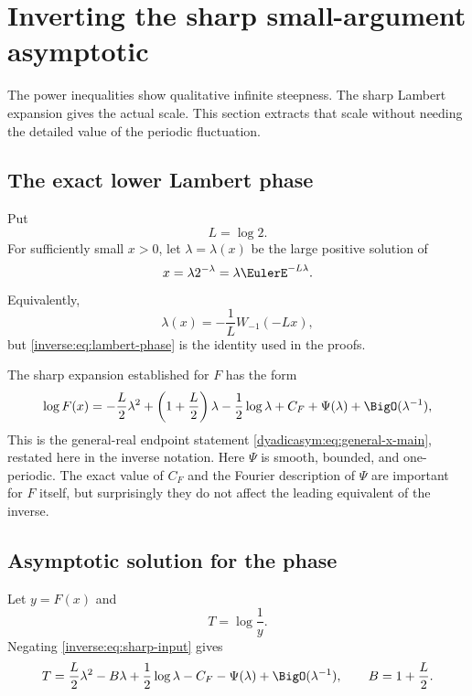 \documentclass[11pt,oneside]{article}
\theoremstyle{definition}
\theoremstyle{remark}
\begin{document}
\section{Inverting the sharp small-argument asymptotic}
\label{inverse:sec:inverse-asymptotic}

The power inequalities show qualitative infinite steepness.  The sharp
Lambert expansion gives the actual scale.  This section extracts that
scale without needing the detailed value of the periodic fluctuation.

\subsection{The exact lower Lambert phase}

Put
\[
 L=\log2.
\]
For sufficiently small $x>0$, let $\lambda=\lambda(x)$ be the large
positive solution of
\begin{equation}
 x=\lambda2^{-\lambda}
   =\lambda\EulerE^{-L\lambda}. \label{inverse:eq:lambert-phase}
\end{equation}
Equivalently,
\[
 \lambda(x)=-\frac1L W_{-1}(-Lx),
\]
but \eqref{inverse:eq:lambert-phase} is the identity used in the proofs.

The sharp expansion established for $F$ has the form
\begin{equation}
 \log F(x)
 =-\frac L2\lambda^2+
   \left(1+\frac L2\right)\lambda
   -\frac12\log\lambda
 +C_F+\Psi(\lambda)
   +\BigO(\lambda^{-1}), \label{inverse:eq:sharp-input}
\end{equation}
This is the general-real endpoint statement
\eqref{dyadicasym:eq:general-x-main}, restated here in the inverse notation.
Here $\Psi$ is smooth, bounded, and one-periodic.  The exact value of
$C_F$ and the Fourier description of $\Psi$ are important for $F$ itself,
but surprisingly they do not affect the leading equivalent of the
inverse.

\subsection{Asymptotic solution for the phase}

Let $y=F(x)$ and
\[
 T=\log\frac1y.
\]
Negating \eqref{inverse:eq:sharp-input} gives
\begin{equation}
 T=\frac L2\lambda^2-B\lambda+\frac12\log\lambda
     -C_F-\Psi(\lambda)+\BigO(\lambda^{-1}),
 \qquad B=1+\frac L2. \label{inverse:eq:T-lambda}
\end{equation}
\end{document}

